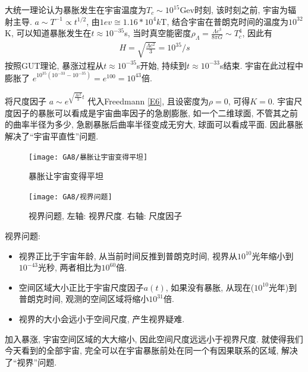 大统一理论认为暴胀发生在宇宙温度为$T_c\sim 10^{15}$Gev时刻, 该时刻之前, 宇宙为辐射主导. $a\sim T^{-1}\propto t^{1/2}$, 
由$1ev \cong 1.16*10^4 k$T, 结合宇宙在普朗克时间的温度为$10^{32}$K, 可以知道暴胀发生在$t\approx 10^{-35}$s, 当时真空能密度$\rho_{\Lambda}=\frac{\Lambda c^3}{8\pi G}\sim T_c^4$, 因此有
\begin{align*}
    H=\sqrt{\frac{\Lambda c^2}{3}}=10^{35}/s
\end{align*}
按照GUT理论, 暴涨过程从$t\approx 10^{-35}$s开始, 持续到$t\approx 10^{-33}$s结束. 宇宙在此过程中膨胀了 $e^{10^{35}(10^{-33}-10^{-35})}=e^{100}=10^{43}$倍.  

将尺度因子 $a\sim e^{\sqrt{\frac{\Lambda c^2}{3}}t}$ 代入Freedmann \ref{E6}, 且设密度为$\rho =0$, 可得$K=0$. 宇宙尺度因子的暴胀可以看成是宇宙曲率因子的急剧膨胀, 如一个二维球面, 不管其之前的曲率半径为多少, 急剧暴胀后曲率半径变成无穷大, 球面可以看成平面. 因此暴胀解决了``宇宙平直性''问题. 

\begin{figure}[!htb]
    \centering
    \texttt{[image: GA8/暴胀让宇宙变得平坦]}
    \caption{暴胀让宇宙变得平坦}
\end{figure}

\begin{figure}[!htb]
    \centering
    \texttt{[image: GA8/视界问题]}
    \caption{视界问题, 左轴: 视界尺度. 右轴: 尺度因子}
\end{figure}


视界问题: 
\begin{itemize}\small
    \item 视界正比于宇宙年龄, 从当前时间反推到普朗克时间, 视界从$10^{10}$光年缩小到$10^{-43}$光秒, 两者相比为$10^{60}$倍. 
    \item 空间区域大小正比于宇宙尺度因子$a(t)$, 如果没有暴胀, 从现在($10^{10}$光年)到普朗克时间, 观测的空间区域将缩小$10^{31}$倍. 
    \item 视界的大小会远小于空间尺度, 产生视界疑难. 
\end{itemize}
加入暴涨, 宇宙空间区域的大大缩小, 因此空间尺度远远小于视界尺度. 就使得我们今天看到的全部宇宙, 完全可以在宇宙暴胀前处在同一个有因果联系的区域, 解决了``视界''问题. 

